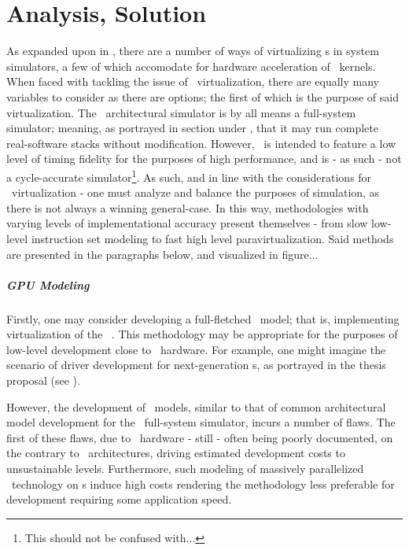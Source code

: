

\chapter{Analysis, Solution}
\label{cha:analysissolution}
As expanded upon in , there are a number of ways of virtualizing \dvttermgpu s in system simulators, a few of which accomodate for hardware acceleration of \dvttermgpu\ kernels.
When faced with tackling the issue of \dvttermgpu\ virtualization, there are equally many variables to consider as there are options; the first of which is the purpose of said virtualization.
The \dvttermsimics\ architectural simulator is by all means a full-system simulator; meaning, as portrayed in section  under , that it may run complete real-software stacks without modification.
However, \dvttermsimics\ is intended to feature a low level of timing fidelity for the purposes of high performance, and is - as such - not a cycle-accurate simulator\footnote{This should not be confused with...}.
As such, and in line with the considerations for \dvttermgpu\ virtualization - one must analyze and balance the purposes of simulation, as there is not always a winning general-case.
In this way, methodologies with varying levels of implementational accuracy present themselves - from slow low-level instruction set modeling to fast high level paravirtualization.
Said methods are presented in the paragraphs below, and visualized in figure...

\paragraph{GPU Modeling}
\label{par:analysissolution_gpumodeling}
Firstly, one may consider developing a full-fletched \dvttermgpu\ model; that is, implementing virtualization of the \dvttermgpu\ \dvttermisa .
This methodology may be appropriate for the purposes of low-level development close to \dvttermgpu\ hardware.
For example, one might imagine the scenario of driver development for next-generation \dvttermgpu s, as portrayed in the thesis proposal (see ).

However, the development of \dvttermgpu\ models, similar to that of common architectural model development for the \dvttermsimics\ full-system simulator, incurs a number of flaws.
The first of these flaws, due to \dvttermgpu\ hardware - still - often being poorly documented, on the contrary to \dvttermcpu\ architectures, driving estimated development costs to unsustainable levels.
Furthermore, such modeling of massively parallelized \dvttermgpu\ technology on \dvttermcpu s induce high costs rendering the methodology less preferable for development requiring some application speed.

